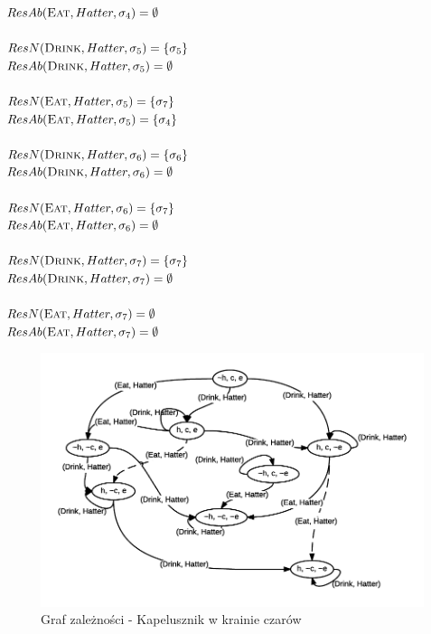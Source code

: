 \documentclass{article}
\begin{document}
$ResAb(\textsc{Eat},Hatter,\sigma_{4})=\emptyset$\\\\
$ResN(\textsc{Drink},Hatter,\sigma_{5})=\{\sigma_{5}\}$\\
$ResAb(\textsc{Drink},Hatter,\sigma_{5})=\emptyset$\\\\
$ResN(\textsc{Eat},Hatter,\sigma_{5})=\{\sigma_{7}\}$\\
$ResAb(\textsc{Eat},Hatter,\sigma_{5})=\{\sigma_{4}\}$\\\\
$ResN(\textsc{Drink},Hatter,\sigma_{6})=\{\sigma_{6}\}$\\
$ResAb(\textsc{Drink},Hatter,\sigma_{6})=\emptyset$\\\\
$ResN(\textsc{Eat},Hatter,\sigma_{6})=\{\sigma_{7}\}$\\
$ResAb(\textsc{Eat},Hatter,\sigma_{6})=\emptyset$\\\\
$ResN(\textsc{Drink},Hatter,\sigma_{7})=\{\sigma_{7}\}$\\
$ResAb(\textsc{Drink},Hatter,\sigma_{7})=\emptyset$\\\\
$ResN(\textsc{Eat},Hatter,\sigma_{7})=\emptyset$\\
$ResAb(\textsc{Eat},Hatter,\sigma_{7})=\emptyset$\\

\begin{figure}[H]
\centering
\includegraphics[scale=1]{Alice}
\caption{Graf zależności - Kapelusznik w krainie czarów}
\end{figure}
\end{document}
